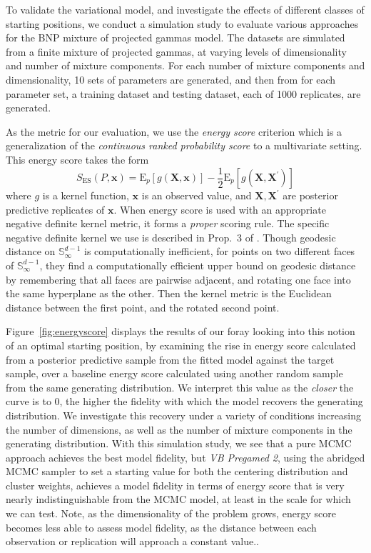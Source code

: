 To validate the variational model, and investigate the effects of different classes of 
    starting positions, we conduct a simulation study to evaluate various approaches for
    the BNP mixture of projected gammas model.  The datasets are simulated from a finite
    mixture of projected gammas, at varying levels of dimensionality and number of mixture
    components.  For each number of mixture components and dimensionality, 10 sets of
    parameters are generated, and then from for each parameter set, a training dataset and 
    testing dataset, each of \num{1000} replicates, are generated.

As the metric for our evaluation, we use the \emph{energy score} criterion \citep{gneiting2007}
    which is a generalization of the \emph{continuous ranked probability score} to a multivariate
    setting.  This energy score takes the form
    \[
      S_{\text{ES}}(P, \bm{x}) = \text{E}_p\left[g(\bm{X},\bm{x})\right] - 
        \frac{1}{2}\text{E}_p\left[g(\bm{X},\bm{X}^{\prime})\right]
    \]
    where $g$ is a kernel function, $\bm{x}$ is an observed value, and 
    $\bm{X},\bm{X}^{\prime}$ are posterior predictive replicates of $\bm{x}$.
    When energy score is used with an appropriate negative definite kernel 
    metric, it forms a \emph{proper} scoring rule. The specific negative 
    definite kernel we use is described in Prop.~3 of \cite{trubey:pg}.  Though 
    geodesic distance on $\mathbb{S}_{\infty}^{d-1}$ is computationally inefficient,
    for points on two different faces of $\mathbb{S}_{\infty}^{d-1}$,
    they find a computationally efficient upper bound on geodesic distance by 
    remembering that all faces are pairwise adjacent, and rotating one face into the
    same hyperplane as the other.  Then the kernel metric is the Euclidean distance
    between the first point, and the rotated second point.
    
Figure~\ref{fig:energyscore} displays the results of our foray looking into this 
    notion of an optimal starting position, by examining the rise in energy score 
    calculated from a posterior predictive sample from the fitted model against the target 
    sample, over a baseline energy score calculated using another random sample from the same 
    generating distribution.  We interpret this value as the \emph{closer} the curve is to 0, 
    the higher the fidelity with which the model recovers the generating distribution.  
    We investigate this recovery under a variety of conditions increasing the number of dimensions,
    as well as the number of mixture components in the generating distribution. With this simulation
    study, we see that
    a pure MCMC approach achieves the best model fidelity, but \emph{VB Pregamed 2}, using 
    the abridged MCMC sampler to set a starting value for both the centering distribution 
    and cluster weights, achieves a model fidelity in terms of energy score that is very
    nearly indistinguishable from the MCMC model, at least in the scale for which we can test.
    Note, as the dimensionality of the problem grows, energy score becomes less able to assess 
    model fidelity, as the distance between each observation or replication will approach a 
    constant value..

